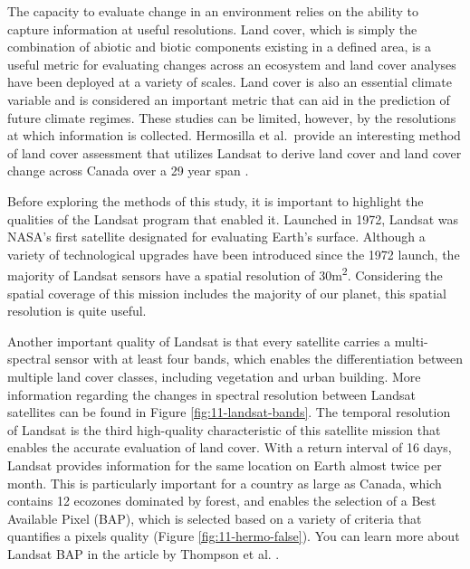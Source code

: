 \documentclass[
]{book}
\begin{document}
The capacity to evaluate change in an environment relies on the ability
to capture information at useful resolutions. Land cover, which is
simply the combination of abiotic and biotic components existing in a
defined area, is a useful metric for evaluating changes across an
ecosystem and land cover analyses have been deployed at a variety of
scales. Land cover is also an essential climate variable and is
considered an important metric that can aid in the prediction of future
climate regimes. These studies can be limited, however, by the
resolutions at which information is collected. Hermosilla et al.~provide an interesting method of land cover assessment that utilizes Landsat to derive land cover and land cover change across Canada over a
29 year span \citep{hermosilla_disturbance-informed_2018}.

Before exploring the methods of this study, it is important to highlight
the qualities of the Landsat program that enabled it. Launched in 1972,
Landsat was NASA's first satellite designated for evaluating Earth's
surface. Although a variety of technological upgrades have been
introduced since the 1972 launch, the majority of Landsat sensors have a
spatial resolution of 30m\textsuperscript{2}. Considering the spatial coverage of this
mission includes the majority of our planet, this spatial resolution is
quite useful.

Another important quality of Landsat is that every satellite carries a
multi-spectral sensor with at least four bands, which enables the
differentiation between multiple land cover classes, including
vegetation and urban building. More information regarding the changes in
spectral resolution between Landsat satellites can be found in Figure
\ref{fig:11-landsat-bands}. The temporal resolution of Landsat is the
third high-quality characteristic of this satellite mission that enables
the accurate evaluation of land cover. With a return interval of 16
days, Landsat provides information for the same location on Earth almost
twice per month. This is particularly important for a country as large
as Canada, which contains 12 ecozones dominated by forest, and enables
the selection of a Best Available Pixel (BAP), which is selected based
on a variety of criteria that quantifies a pixels quality (Figure
\ref{fig:11-hermo-false}). You can learn more about Landsat BAP in the article by Thompson et al. \citep{thompson_mapping_2015}.
\end{document}
